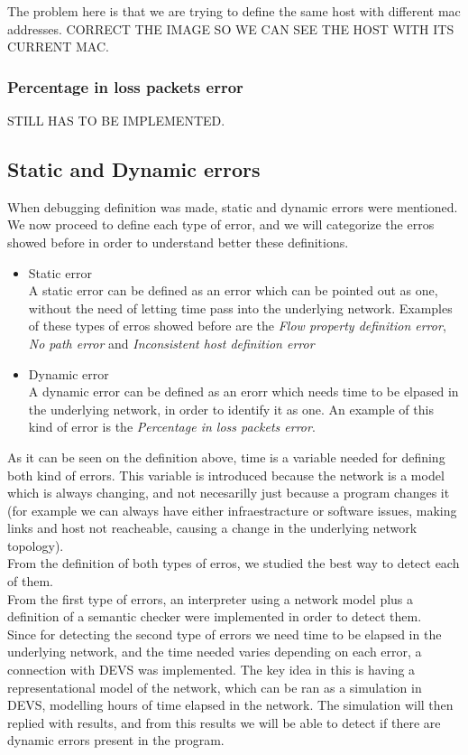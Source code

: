 The problem here is that we are trying to define the same host with different mac addresses. CORRECT THE IMAGE SO WE CAN SEE THE HOST WITH ITS CURRENT MAC.

\subsubsection{Percentage in loss packets error}

STILL HAS TO BE IMPLEMENTED.

\subsection{Static and Dynamic errors}

When debugging definition was made, static and dynamic errors were mentioned. We now proceed to define each type of error, and we will categorize the erros showed before in order to understand better these definitions.

\begin{itemize}

\item Static error\\
A static error can be defined as an error which can be pointed out as one, without the need of letting time pass into the underlying network. Examples of these types of erros showed before are the \textit{Flow property definition error}, \textit{No path error} and \textit{Inconsistent host definition error}
\item Dynamic error\\
A dynamic error can be defined as an erorr which needs time to be elpased in the underlying network, in order to identify it as one. An example of this kind of error is the \textit{Percentage in loss packets error}. 
\end{itemize} 

As it can be seen on the definition above, time is a variable needed for defining both kind of errors. This variable is introduced because the network is a model which is always changing, and not necesarilly just because a program changes it (for example we can always have either infraestracture or software issues, making links and host not reacheable, causing a change in the underlying network topology).\\
From the definition of both types of erros, we studied the best way to detect each of them.\\
From the first type of errors, an interpreter using a network model plus a definition of a semantic checker were implemented in order to detect them.\\ Since for detecting the second type of errors we need time to be elapsed in the underlying network, and the time needed varies depending on each error, a connection with DEVS was implemented. The key idea in this is having a representational model of the network, which can be ran as a simulation in DEVS, modelling hours of time elapsed in the network. The simulation will then replied with results, and from this results we will be able to detect if there are dynamic errors present in the program. 


